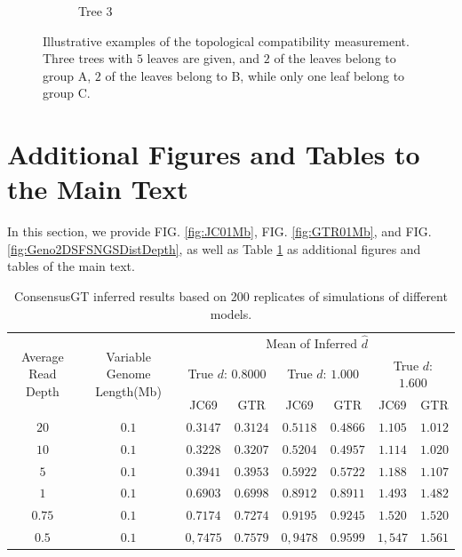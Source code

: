 \documentclass{article}
\begin{document}
\begin{figure}[h]
\begin{subfigure}[b]{0.3\textwidth}
\begin{center}
\end{center}
\caption{Tree 3}
\end{subfigure}
\vspace{0.5cm}
\caption{Illustrative examples of the topological compatibility measurement. Three trees with $5$ leaves are given, and $2$ of the leaves belong to group A, $2$ of the leaves belong to B, while only one leaf belong to group C.}
\label{fig:topologicaltree}
\end{figure}

\section{Additional Figures and Tables to the Main Text}
In this section, we provide FIG. \ref{fig:JC01Mb}, FIG. \ref{fig:GTR01Mb}, and FIG. \ref{fig:Geno2DSFSNGSDistDepth}, as well as Table \ref{tab:ConsensusGT01M} as additional figures and tables of the main text.
\begin{table}[h]
    \centering
    \begin{tabular}{|c|c|c|c|c|c|c|c|}
     \hline
      \multirow{3}{*}{Average Read Depth} & \multirow{3}{*}{Variable Genome Length(Mb)} & \multicolumn{6}{c|}{Mean of Inferred $\hat{d}$}\\
      &&\multicolumn{2}{c|}{True $d$: $0.8000$}&\multicolumn{2}{c|}{True $d$: $1.000$}&\multicolumn{2}{c|}{True $d$: $1.600$}\\
      &&JC69&GTR&JC69&GTR&JC69&GTR\\
      \hline
      $20$ & $0.1$ & $0.3147$ & $0.3124$ & $0.5118$ & $0.4866$ & $1.105$ & $1.012$\\
      \hline
      $10$ & $0.1$ & $0.3228$ & $0.3207$ & $0.5204$ & $0.4957$ & $1.114$ & $1.020$\\
      \hline
      $5$ & $0.1$ & $0.3941$ & $0.3953$ & $0.5922$ & $0.5722$ & $1.188$ & $1.107$\\
      \hline
      $1$ & $0.1$ & $0.6903$ & $0.6998$ & $0.8912$ & $0.8911$ & $1.493$ & $1.482$\\
       \hline
     $0.75$ & $0.1$ & $0.7174$ & $0.7274$ & $0.9195$ & $0.9245$ & $1.520$ & $1.520$\\
      \hline
      $0.5$ & $0.1$ & $0,7475$ & $0.7579$ & $0,9478$ & $0.9599$ & $1,547$ & $1.561$\\
      \hline
      \end{tabular}
    \caption{ConsensusGT inferred results based on 200 replicates of simulations of different models.}
    \label{tab:ConsensusGT01M}
\end{table}
\end{document}
